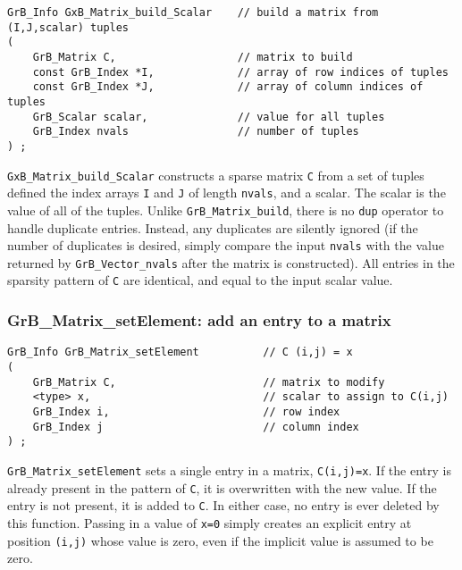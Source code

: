 \documentclass[12pt]{article}
\begin{document}
\begin{mdframed}[userdefinedwidth=6in]
{\footnotesize
\begin{verbatim}
GrB_Info GxB_Matrix_build_Scalar    // build a matrix from (I,J,scalar) tuples
(
    GrB_Matrix C,                   // matrix to build
    const GrB_Index *I,             // array of row indices of tuples
    const GrB_Index *J,             // array of column indices of tuples
    GrB_Scalar scalar,              // value for all tuples
    GrB_Index nvals                 // number of tuples
) ;
\end{verbatim} } \end{mdframed}

\verb'GxB_Matrix_build_Scalar' constructs a sparse matrix \verb'C' from a set
of tuples defined the index arrays \verb'I' and \verb'J' of length
\verb'nvals', and a scalar.  The scalar is the value of all of the tuples.
Unlike \verb'GrB_Matrix_build', there is no \verb'dup' operator to handle
duplicate entries.  Instead, any duplicates are silently ignored (if the number
of duplicates is desired, simply compare the input \verb'nvals' with the value
returned by \verb'GrB_Vector_nvals' after the matrix is constructed).  All
entries in the sparsity pattern of \verb'C' are identical, and equal to the
input scalar value.

\newpage
\subsubsection{{\sf GrB\_Matrix\_setElement:}   add an entry to a matrix}
\label{matrix_setElement}

\begin{mdframed}[userdefinedwidth=6in]
{\footnotesize
\begin{verbatim}
GrB_Info GrB_Matrix_setElement          // C (i,j) = x
(
    GrB_Matrix C,                       // matrix to modify
    <type> x,                           // scalar to assign to C(i,j)
    GrB_Index i,                        // row index
    GrB_Index j                         // column index
) ;
\end{verbatim} } \end{mdframed}

\verb'GrB_Matrix_setElement' sets a single entry in a matrix, \verb'C(i,j)=x'.
If the entry is already present in the pattern of \verb'C', it is overwritten
with the new value.  If the entry is not present, it is added to \verb'C'.  In
either case, no entry is ever deleted by this function.  Passing in a value of
\verb'x=0' simply creates an explicit entry at position \verb'(i,j)' whose
value is zero, even if the implicit value is assumed to be zero.
\end{document}

